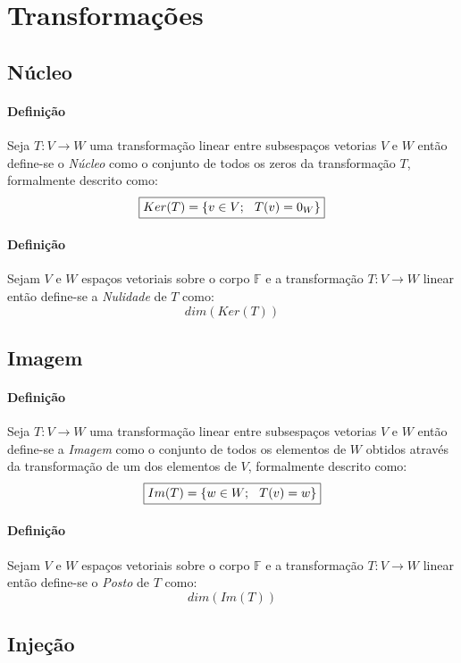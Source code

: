 \documentclass{article}
\begin{document}
    \section{Transformações}
        \subsection{Núcleo}
            \paragraph{Definição}Seja $T: V\rightarrow W$ uma transformação linear entre subsespaços vetorias $V$ e $W$ então define-se o \textit{Núcleo} como o conjunto de todos os zeros da transformação $T$, formalmente descrito como:
                \[\boxed{Ker(T) = \{v\in V; \hspace{2.5mm} T(v) = 0_{W}\}}\]
            \paragraph{Definição}Sejam $V$ e $W$ espaços vetoriais sobre o corpo $\mathbb{F}$ e a transformação $T: V\rightarrow W$ linear então define-se a \textit{Nulidade} de $T$ como:
                \[\boxed{dim(Ker(T))}\]

        \subsection{Imagem}
            \paragraph{Definição}Seja $T: V\rightarrow W$ uma transformação linear entre subsespaços vetorias $V$ e $W$ então define-se a \textit{Imagem} como o conjunto de todos os elementos de $W$ obtidos através da transformação de um dos elementos de $V$, formalmente descrito como:
                \[\boxed{Im(T) = \{w\in W; \hspace{2.5mm} T(v) = w\}}\]
            \paragraph{Definição}Sejam $V$ e $W$ espaços vetoriais sobre o corpo $\mathbb{F}$ e a transformação $T: V\rightarrow W$ linear então define-se o \textit{Posto} de $T$ como:
                \[\boxed{dim(Im(T))}\]

        \subsection{Injeção}
\end{document}
